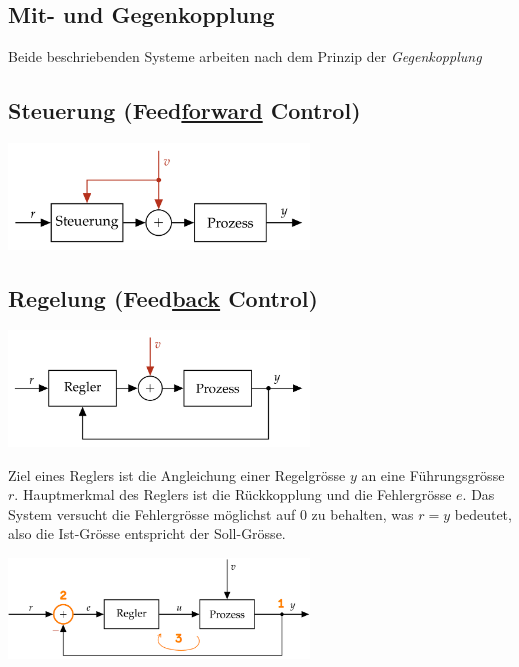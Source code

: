 \documentclass[
  10pt,
  a4paper,
  german]{article}
\numberwithin{equation}{section}
\begin{document}
\begin{multicols}{2}
\begin{tcolorbox}
\end{tcolorbox}

\hypertarget{mit--und-gegenkopplung}{%
\subsection{Mit- und Gegenkopplung}\label{mit--und-gegenkopplung}}

Beide beschriebenden Systeme arbeiten nach dem Prinzip der
\emph{Gegenkopplung}

\hypertarget{steuerung-feedforward-control}{%
\subsection{\texorpdfstring{Steuerung (Feed\ul{forward}
Control)}{Steuerung (Feedforward Control)}}\label{steuerung-feedforward-control}}

\includegraphics[width=8cm,height=\textheight]{images/steuerung.png}

\hypertarget{regelung-feedback-control}{%
\subsection{\texorpdfstring{Regelung (Feed\ul{back}
Control)}{Regelung (Feedback Control)}}\label{regelung-feedback-control}}

\includegraphics[width=8cm,height=\textheight]{images/regelung.png}

Ziel eines Reglers ist die Angleichung einer Regelgrösse \(y\) an eine
Führungsgrösse \(r\). Hauptmerkmal des Reglers ist die Rückkopplung und
die Fehlergrösse \(e\). Das System versucht die Fehlergrösse möglichst
auf \(0\) zu behalten, was \(r = y\) bedeutet, also die Ist-Grösse
entspricht der Soll-Grösse.

\includegraphics[width=8cm,height=\textheight]{images/definition_regelung.png}


\end{multicols}
\end{document}
